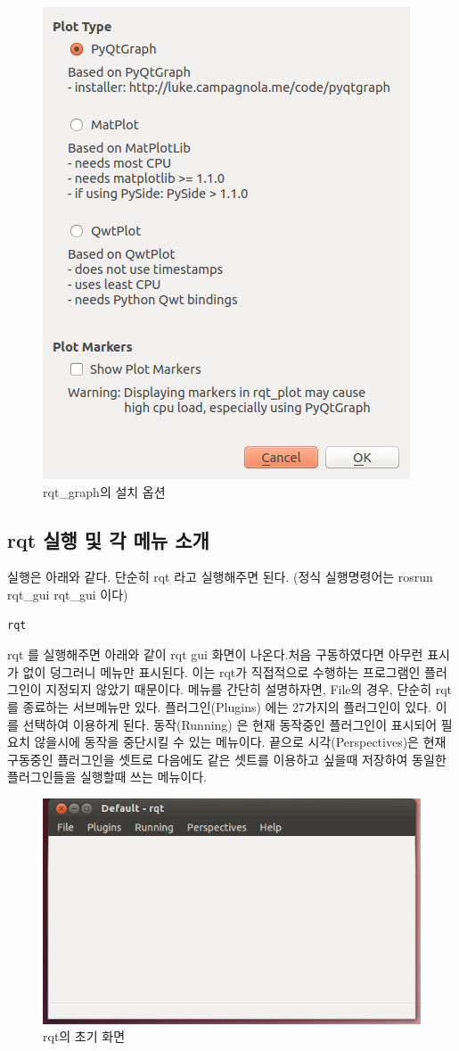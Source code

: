 \begin{figure}[h]
\centering\includegraphics[width=0.5\columnwidth]{pictures/chapter6/rqtplotoption.png}
\caption{rqt\_graph의 설치 옵션}
\end{figure}

\subsection{rqt 실행 및 각 메뉴 소개}

실행은 아래와 같다. 단순히 rqt 라고 실행해주면 된다. (정식 실행명령어는 rosrun rqt\_gui rqt\_gui 이다)

\begin{lstlisting}[language=bash]
rqt
\end{lstlisting}

rqt 를 실행해주면 아래와 같이 rqt gui 화면이 나온다.처음 구동하였다면 아무런 표시가 없이 덩그러니 메뉴만 표시된다. 이는 rqt가 직접적으로 수행하는 프로그램인 플러그인이 지정되지 않았기 때문이다. 메뉴를 간단히 설명하자면, File의 경우, 단순히 rqt를 종료하는 서브메뉴만 있다. 플러그인(Plugins) 에는 27가지의 플러그인이 있다. 이를 선택하여 이용하게 된다. 동작(Running) 은 현재 동작중인 플러그인이 표시되어 필요치 않을시에 동작을 중단시킬 수 있는 메뉴이다. 끝으로 시각(Perspectives)은 현재 구동중인 플러그인을 셋트로 다음에도 같은 셋트를 이용하고 싶을때 저장하여 동일한 플러그인들을 실행할때 쓰는 메뉴이다.

\begin{figure}[h]
\centering\includegraphics[width=0.6\columnwidth]{pictures/chapter6/rqt.png}
\caption{rqt의 초기 화면}
\end{figure}

